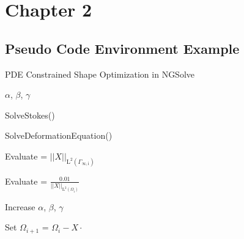 \section{Chapter 2}
\subsection{Pseudo Code Environment Example}

\begin{algorithm}


    \renewcommand{\thealgorithm}{}

    \caption{PDE Constrained Shape Optimization in NGSolve}

    \begin{algorithmic}[1]

    \State {}

    \State {} $\alpha$, $\beta$, $\gamma$ 


        \State SolveStokes() 

        \State SolveDeformationEquation() 

        \State Evaluate  = $ || X ||_{\mathrm{L}^2(\Gamma_{\infty , \mathrm{i}})} $

        \State Evaluate  = $ \frac{0.01}{|| X ||_{\mathrm{L}^2(\Omega_{\mathrm{i}})}} $


            \State Increase $\alpha$, $\beta$, $\gamma$


            \State {}

        \EndIf

        \EndIf

        \State Set $\Omega_{i+1}$ =  $\Omega_i - X \cdot$  

    \EndFor

    \end{algorithmic}

\end{algorithm}